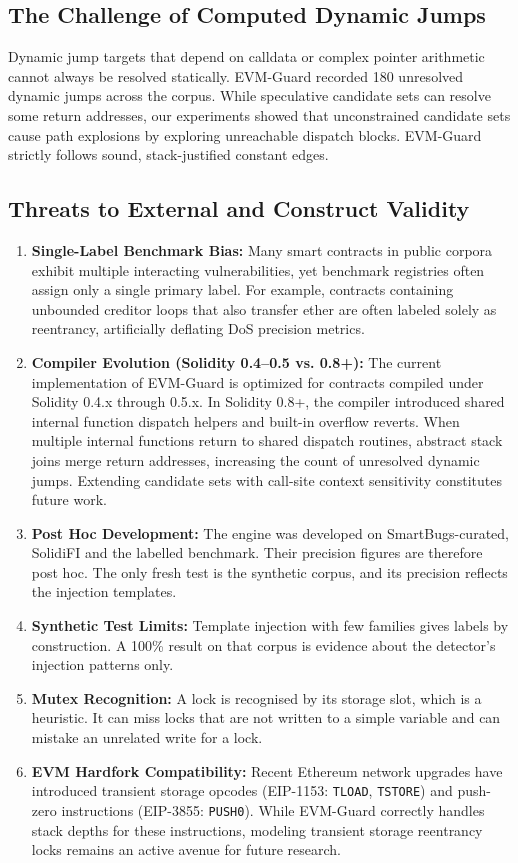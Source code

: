\documentclass[conference]{IEEEtran}
\begin{document}
\subsection{The Challenge of Computed Dynamic Jumps}
Dynamic jump targets that depend on calldata or complex pointer arithmetic cannot always be resolved statically. EVM-Guard recorded 180 unresolved dynamic jumps across the corpus. While speculative candidate sets can resolve some return addresses, our experiments showed that unconstrained candidate sets cause path explosions by exploring unreachable dispatch blocks. EVM-Guard strictly follows sound, stack-justified constant edges.

\subsection{Threats to External and Construct Validity}
\begin{enumerate}
    \item \textbf{Single-Label Benchmark Bias:} Many smart contracts in public corpora exhibit multiple interacting vulnerabilities, yet benchmark registries often assign only a single primary label. For example, contracts containing unbounded creditor loops that also transfer ether are often labeled solely as reentrancy, artificially deflating DoS precision metrics.
    \item \textbf{Compiler Evolution (Solidity 0.4--0.5 vs. 0.8+):} The current implementation of EVM-Guard is optimized for contracts compiled under Solidity 0.4.x through 0.5.x. In Solidity 0.8+, the compiler introduced shared internal function dispatch helpers and built-in overflow reverts. When multiple internal functions return to shared dispatch routines, abstract stack joins merge return addresses, increasing the count of unresolved dynamic jumps. Extending candidate sets with call-site context sensitivity constitutes future work.
    \item \textbf{Post Hoc Development:} The engine was developed on SmartBugs-curated, SolidiFI and the labelled benchmark. Their precision figures are therefore post hoc. The only fresh test is the synthetic corpus, and its precision reflects the injection templates.
    \item \textbf{Synthetic Test Limits:} Template injection with few families gives labels by construction. A 100\% result on that corpus is evidence about the detector's injection patterns only.
    \item \textbf{Mutex Recognition:} A lock is recognised by its storage slot, which is a heuristic. It can miss locks that are not written to a simple variable and can mistake an unrelated write for a lock.
    \item \textbf{EVM Hardfork Compatibility:} Recent Ethereum network upgrades have introduced transient storage opcodes (EIP-1153: \texttt{TLOAD}, \texttt{TSTORE}) and push-zero instructions (EIP-3855: \texttt{PUSH0}). While EVM-Guard correctly handles stack depths for these instructions, modeling transient storage reentrancy locks remains an active avenue for future research.
\end{enumerate}
\end{document}
